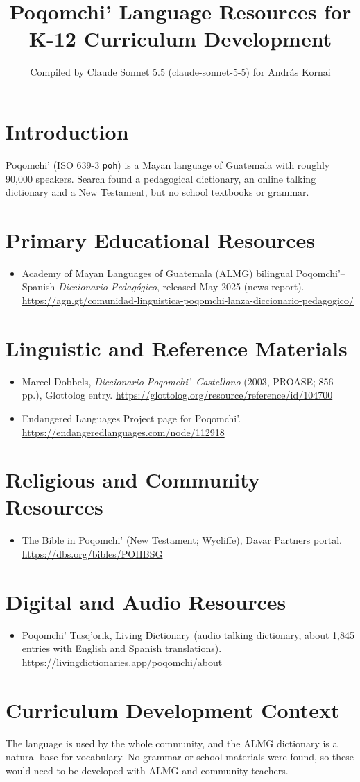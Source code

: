 \documentclass[12pt]{article}
\title{Poqomchi' Language Resources for K-12 Curriculum Development}
\author{Compiled by Claude Sonnet 5.5 (claude-sonnet-5-5) for Andr\'as Kornai}
\date{}
\begin{document}
\maketitle

\section{Introduction}
Poqomchi' (ISO 639-3 \texttt{poh}) is a Mayan language of Guatemala with roughly 90,000 speakers. Search found a pedagogical dictionary, an online talking dictionary and a New Testament, but no school textbooks or grammar.

\section{Primary Educational Resources}
\begin{itemize}
\item Academy of Mayan Languages of Guatemala (ALMG) bilingual Poqomchi'--Spanish \emph{Diccionario Pedag\'ogico}, released May 2025 (news report). \url{https://agn.gt/comunidad-linguistica-poqomchi-lanza-diccionario-pedagogico/}
\end{itemize}

\section{Linguistic and Reference Materials}
\begin{itemize}
\item Marcel Dobbels, \emph{Diccionario Poqomchi'--Castellano} (2003, PROASE; 856 pp.), Glottolog entry. \url{https://glottolog.org/resource/reference/id/104700}
\item Endangered Languages Project page for Poqomchi'. \url{https://endangeredlanguages.com/node/112918}
\end{itemize}

\section{Religious and Community Resources}
\begin{itemize}
\item The Bible in Poqomchi' (New Testament; Wycliffe), Davar Partners portal. \url{https://dbs.org/bibles/POHBSG}
\end{itemize}

\section{Digital and Audio Resources}
\begin{itemize}
\item Poqomchi' Tusq'orik, Living Dictionary (audio talking dictionary, about 1,845 entries with English and Spanish translations). \url{https://livingdictionaries.app/poqomchi/about}
\end{itemize}

\section{Curriculum Development Context}
The language is used by the whole community, and the ALMG dictionary is a natural base for vocabulary. No grammar or school materials were found, so these would need to be developed with ALMG and community teachers.
\end{document}
